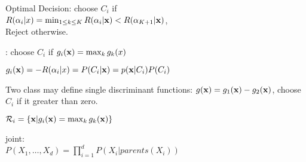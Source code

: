 \begin{description}
\[\]
\item Optimal Decision: choose $C_i$ if \\$R(\alpha_i|x) = \min_{1\leq k\leq
K}R(\alpha_i|\mathbf{x}) < R(\alpha_{K+1} | \mathbf{x})$, \\Reject otherwise.
\item [Discriminant Functions]: choose $C_i$ if $g_i(\mathbf{x}) = \max_k g_k(x)$
\item $g_i(\mathbf{x}) = -R(\alpha_i|x) = P(C_i|\mathbf{x}) = p(\mathbf{x}|C_i)P(C_i)$
\item Two class may define single discriminant functions: $g(\mathbf{x}) = g_1(\mathbf{x}) -
g_2(\mathbf{x})$, choose $C_i$ if it greater than zero.
\item [Decision Regions] $\mathcal{R}_i = \{\mathbf{x}|g_i(\mathbf{x}) = \max_k g_k(\mathbf{x})\}$
\item[Bayesian Network] joint:\\ $P(X_1,\dots, X_d) = \prod_{i=1}^d P(X_i|parents(X_i))$
\end{description}
